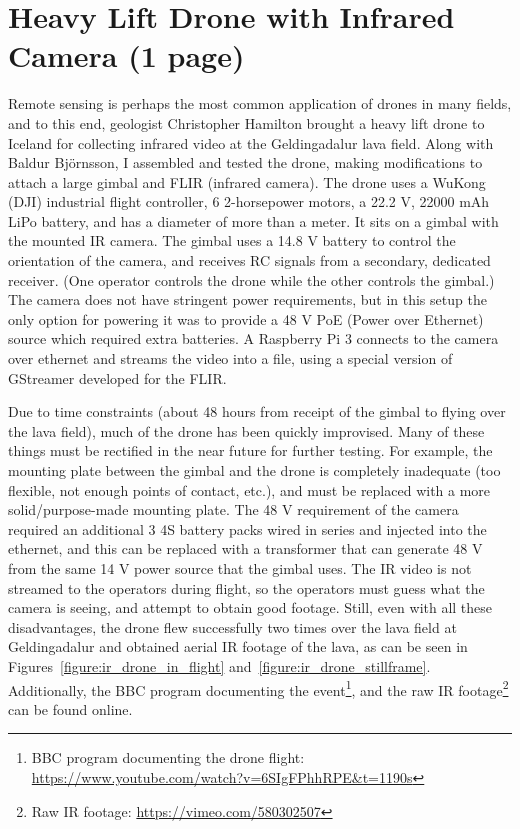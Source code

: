 \section{Heavy Lift Drone with Infrared Camera (1 page)}
\label{section:ir_drone}

Remote sensing is perhaps the most common application of drones in many fields,
and to this end, geologist Christopher Hamilton brought a heavy lift drone to Iceland for collecting infrared video
at the Geldingadalur lava field.
Along with Baldur Björnsson, I assembled and tested the drone,
making modifications to attach a large gimbal and FLIR (infrared camera).
The drone uses a WuKong (DJI) industrial flight controller,
6 2-horsepower motors,
a 22.2 V, 22000 mAh LiPo battery,
and has a diameter of more than a meter.
It sits on a gimbal with the mounted IR camera.
The gimbal uses a 14.8 V battery to control the orientation of the camera,
and receives RC signals from a secondary, dedicated receiver.
(One operator controls the drone while the other controls the gimbal.)
The camera does not have stringent power requirements,
but in this setup the only option for powering it was to provide
a 48 V PoE (Power over Ethernet) source which required extra batteries.
A Raspberry Pi 3 connects to the camera over ethernet and streams the video into a file,
using a special version of GStreamer developed for the FLIR.

Due to time constraints (about 48 hours from receipt of the gimbal
to flying over the lava field),
much of the drone has been quickly improvised.
Many of these things must be rectified in the near future for further testing.
For example, the mounting plate between the gimbal and the drone
is completely inadequate (too flexible, not enough points of contact, etc.),
and must be replaced with a more solid/purpose-made mounting plate.
The 48 V requirement of the camera required an additional 3 4S battery packs
wired in series and injected into the ethernet,
and this can be replaced with a transformer that can generate 48 V
from the same 14 V power source that the gimbal uses.
The IR video is not streamed to the operators during flight,
so the operators must guess what the camera is seeing, and attempt to obtain good footage.
Still, even with all these disadvantages, the drone flew successfully two times
over the lava field at Geldingadalur and obtained aerial IR footage of the lava,
as can be seen in Figures~\ref{figure:ir_drone_in_flight} and~\ref{figure:ir_drone_stillframe}.
Additionally, the BBC program documenting the event\footnote{BBC program documenting the drone flight: \url{https://www.youtube.com/watch?v=6SIgFPhhRPE&t=1190s}}, and the raw IR footage\footnote{Raw IR footage: \url{https://vimeo.com/580302507}} can be found online.

